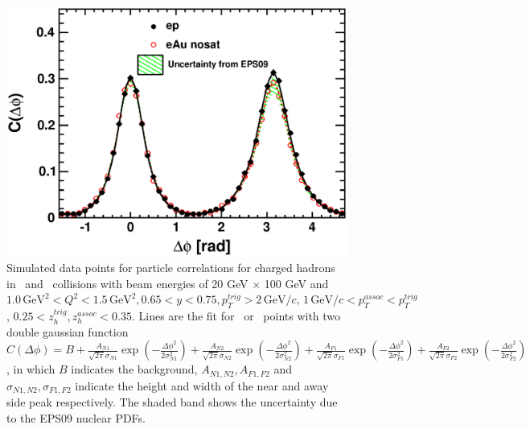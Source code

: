 \begin{figure}
\begin{center}
\includegraphics[width=1.0\textwidth]
{plots/chpt6/20x100_epAndeAu_Q2_1_y_0.7_uncertainty_EPS09_withfit.eps} 
\end{center} 
\caption[Monte Carlo result of \ep\ and \eAu\ diahdron correlation function based on a non-saturation model]{Simulated data points for particle correlations
for charged hadrons in \ep\ and \eAu\ collisions with beam energies of 20 GeV $\times$ 100
GeV and $1.0 \, \mathrm{GeV}^{2}  < Q^{2} < 1.5 \, \mathrm{GeV}^{2} , 0.65 < y < 0.75, p_{T}^{trig} > 2 \, \mathrm{GeV/}c, \, 1
\, \mathrm{GeV/}c < p_{T}^{assoc} < p_{T}^{trig}$, $0.25 < z_{h}^{trig}, z_{h}^{assoc} <
0.35$. Lines are the fit for \ep\ or \eA\ points with two double gaussian function $C(\Delta\phi)=B+ \frac{A_{N1}}{\sqrt{2\pi}\sigma_{N1}}\exp{(-\frac{\Delta\phi^{2}}{2\sigma^{2}_{N1}})}+ \frac{A_{N2}}{\sqrt{2\pi}\sigma_{N2}}\exp{(-\frac{\Delta\phi^{2}}{2\sigma^{2}_{N2}})} +\frac{A_{F1}}{\sqrt{2\pi}\sigma_{F1}}\exp{(-\frac{\Delta\phi^{2}}{2\sigma^{2}_{F1}})}+ \frac{A_{F2}}{\sqrt{2\pi}\sigma_{F2}}\exp{(-\frac{\Delta\phi^{2}}{2\sigma^{2}_{F2}})}$, in which $B$ indicates the background, $A_{N1,N2}, A_{F1,F2}$ and $\sigma_{N1,N2}, \sigma_{F1,F2}$ indicate the height and width of the near and away side peak respectively. The shaded band shows the uncertainty due to the EPS09 nuclear PDFs.
\label{fig:dihadron_base}}
\end{figure}

